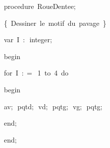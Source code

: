 {\pagebreak[3] 
\vspace{\neglskip}\mbox{\blc  \blk\idt  \mcl procedure\idt \ RoueDentee$;$}\par 
\vspace{\neglskip}\mbox{\blc  \blk\blk\idt  \cmt  \{\ Dessiner\ le\ motif\ du\ pavage\ \}\idt }\par 
\pagebreak[3] 
\vspace{\neglskip}\mbox{\blc  \blk\blk\idt  \mcl var\idt \ I\ $:$\ integer$;$}\par 
\vspace{\neglskip}\mbox{\blc  \blk\idt  \mcl begin\idt }\par 
\pagebreak[3] 
\vspace{\neglskip}\mbox{\blc  \blk\blk\idt  \mcl for\idt \ I\ $:$$=$\ 1\ \mcl to\idt \ 4\ \mcl do\idt }\par 
\vspace{\neglskip}\mbox{\blc  \blk\blk\blk\idt  \mcl begin\idt }\par 
\vspace{\neglskip}\mbox{\blc  \blk\blk\blk\blk\idt  av$;$\ pqtd$;$\ vd$;$\ pqtg$;$\ vg$;$\ pqtg$;$\ }\par 
\vspace{\neglskip}\mbox{\blc  \blk\blk\blk\idt  \mcl end\idt $;$}\par 
\vspace{\neglskip}\mbox{\blc  \blk\idt  \mcl end\idt $;$}\par 
\medskip

}
